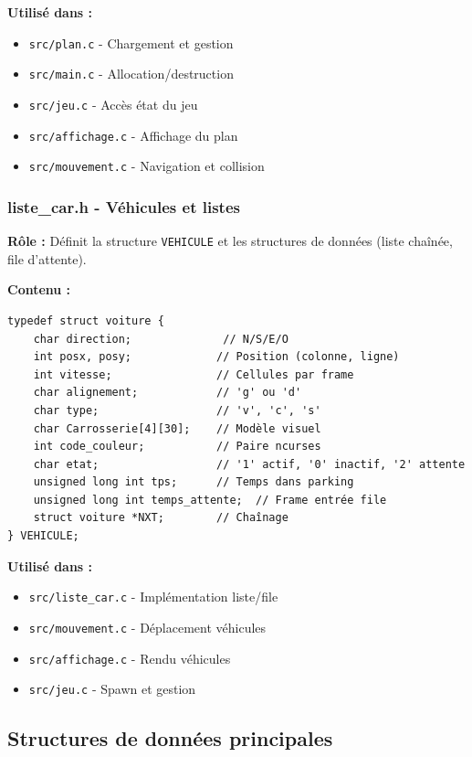\documentclass[12pt,a4paper]{article}
\begin{document}
\textbf{Utilisé dans :}
\begin{itemize}
    \item \texttt{src/plan.c} - Chargement et gestion
    \item \texttt{src/main.c} - Allocation/destruction
    \item \texttt{src/jeu.c} - Accès état du jeu
    \item \texttt{src/affichage.c} - Affichage du plan
    \item \texttt{src/mouvement.c} - Navigation et collision
\end{itemize}

\subsubsection{liste\_car.h - Véhicules et listes}

\textbf{Rôle :} Définit la structure \texttt{VEHICULE} et les structures de données (liste chaînée, file d'attente).

\textbf{Contenu :}
\begin{lstlisting}
typedef struct voiture {
    char direction;              // N/S/E/O
    int posx, posy;             // Position (colonne, ligne)
    int vitesse;                // Cellules par frame
    char alignement;            // 'g' ou 'd'
    char type;                  // 'v', 'c', 's'
    char Carrosserie[4][30];    // Modèle visuel
    int code_couleur;           // Paire ncurses
    char etat;                  // '1' actif, '0' inactif, '2' attente
    unsigned long int tps;      // Temps dans parking
    unsigned long int temps_attente;  // Frame entrée file
    struct voiture *NXT;        // Chaînage
} VEHICULE;
\end{lstlisting}

\textbf{Utilisé dans :}
\begin{itemize}
    \item \texttt{src/liste\_car.c} - Implémentation liste/file
    \item \texttt{src/mouvement.c} - Déplacement véhicules
    \item \texttt{src/affichage.c} - Rendu véhicules
    \item \texttt{src/jeu.c} - Spawn et gestion
\end{itemize}

\subsection{Structures de données principales}
\end{document}
